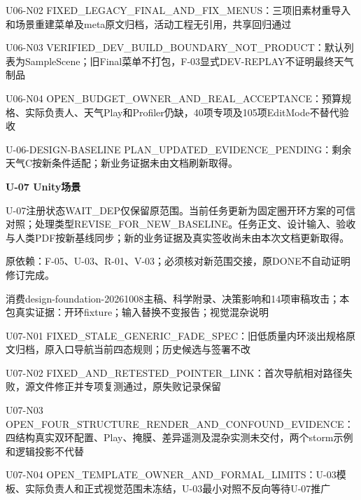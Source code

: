 \documentclass[11pt,a4paper]{article}
\newcommand{\reviewsection}[1]{\par\Needspace{5\baselineskip}\vspace{10pt}\begin{center}{\titlelatin\titlecjk\bfseries\fontsize{14}{20}\selectfont #1}\end{center}}
\begin{document}
U06-\allowbreak{}N02 FIXED\_\allowbreak{}LEGACY\_\allowbreak{}FINAL\_\allowbreak{}AND\_\allowbreak{}FIX\_\allowbreak{}MENUS：三项旧素材重导入和场景重建菜单及meta原文归档，活动工程无引用，共享回归通过


U06-\allowbreak{}N03 VERIFIED\_\allowbreak{}DEV\_\allowbreak{}BUILD\_\allowbreak{}BOUNDARY\_\allowbreak{}NOT\_\allowbreak{}PRODUCT：默认列表为SampleScene；旧Final菜单不打包，F-\allowbreak{}03显式DEV-\allowbreak{}REPLAY不证明最终天气制品


U06-\allowbreak{}N04 OPEN\_\allowbreak{}BUDGET\_\allowbreak{}OWNER\_\allowbreak{}AND\_\allowbreak{}REAL\_\allowbreak{}ACCEPTANCE：预算规格、实际负责人、天气Play和Profiler仍缺，40项专项及105项EditMode不替代验收


U-\allowbreak{}06-\allowbreak{}DESIGN-\allowbreak{}BASELINE PLAN\_\allowbreak{}UPDATED\_\allowbreak{}EVIDENCE\_\allowbreak{}PENDING：剩余天气C按新条件适配；新业务证据未由文档刷新取得。


\reviewsection{U-\allowbreak{}07 Unity场景}
U-\allowbreak{}07注册状态WAIT\_\allowbreak{}DEP仅保留原范围。当前任务更新为固定圈开环方案的可信对照；处理类型REVISE\_\allowbreak{}FOR\_\allowbreak{}NEW\_\allowbreak{}BASELINE。任务正文、设计输入、验收与人类PDF按新基线同步；新的业务证据及真实签收尚未由本次文档更新取得。


原依赖：F-\allowbreak{}05、U-\allowbreak{}03、R-\allowbreak{}01、V-\allowbreak{}03；必须核对新范围交接，原DONE不自动证明修订完成。


消费design-\allowbreak{}foundation-\allowbreak{}20261008主稿、科学附录、决策影响和14项审稿攻击；本包真实证据：开环fixture；输入替换不变报告；视觉混杂说明


U07-\allowbreak{}N01 FIXED\_\allowbreak{}STALE\_\allowbreak{}GENERIC\_\allowbreak{}FADE\_\allowbreak{}SPEC：旧低质量内环淡出规格原文归档，原入口导航当前四态规则；历史候选与签署不改


U07-\allowbreak{}N02 FIXED\_\allowbreak{}AND\_\allowbreak{}RETESTED\_\allowbreak{}POINTER\_\allowbreak{}LINK：首次导航相对路径失败，源文件修正并专项复测通过，原失败记录保留


U07-\allowbreak{}N03 OPEN\_\allowbreak{}FOUR\_\allowbreak{}STRUCTURE\_\allowbreak{}RENDER\_\allowbreak{}AND\_\allowbreak{}CONFOUND\_\allowbreak{}EVIDENCE：四结构真实双环配置、Play、掩膜、差异遥测及混杂实测未交付，两个storm示例和逻辑投影不代替


U07-\allowbreak{}N04 OPEN\_\allowbreak{}TEMPLATE\_\allowbreak{}OWNER\_\allowbreak{}AND\_\allowbreak{}FORMAL\_\allowbreak{}LIMITS：U-\allowbreak{}03模板、实际负责人和正式视觉范围未冻结，U-\allowbreak{}03最小对照不反向等待U-\allowbreak{}07推广
\end{document}
